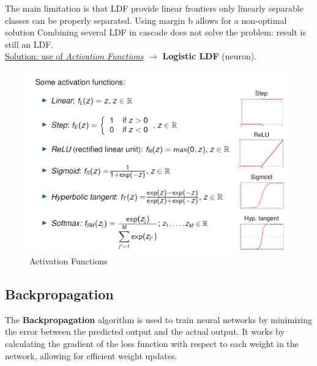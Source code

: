 
\newpage
The main limitation is that LDF provide linear frontiers only linearly separable classes
can be properly separated.
Using margin b allows for a non-optimal solution
Combining several LDF in cascade does not solve the problem:
result is still an LDF.\\
\ul{Solution: use of \textit{Activation Functions}} $\rightarrow$ \textbf{Logistic LDF} (neuron).

\begin{figure}[htbp]
   \centering
   \includegraphics{images/08/activation.png}
   \caption{Activation Functions}
   \label{fig:08/activation}
\end{figure}


\subsection{Backpropagation}

The \textbf{Backpropagation} algorithm is used to train neural networks by minimizing the error between the predicted output and the actual output. It works by calculating the gradient of the loss function with respect to each weight in the network, allowing for efficient weight updates.


